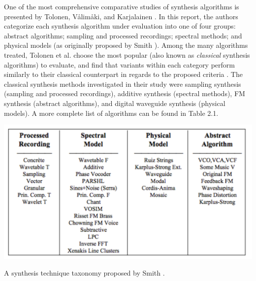 \documentclass[12pt]{report} 	%
\numberwithin{figure}{chapter}
\numberwithin{table}{chapter}
\numberwithin{equation}{chapter}
\begin{document}
\begin{flushleft}
One of the most comprehensive comparative studies of synthesis algorithms is presented by Tolonen, V\aa lim\aa ki, and Karjalainen \cite{Tolonen:1998bh}. In this report, the authors categorize each synthesis algorithm under evaluation into one of four groups: abstract algorithms; sampling and processed recordings; spectral methods; and physical models (as originally proposed by Smith \cite{III:1991hc}). Among the many algorithms treated, Tolonen et al. choose the most popular (also known as \textit{classical} synthesis algorithms) to evaluate, and find that variants within each category perform similarly to their classical counterpart in regards to the proposed criteria \cite[p. 101]{Tolonen:1998bh}. The classical synthesis methods investigated in their study were sampling synthesis (sampling and processed recordings), additive synthesis (spectral methods), FM synthesis (abstract algorithms), and digital waveguide synthesis (physical models). A more complete list of algorithms can be found in Table 2.1.
\begin{table}[h!]
\begin{center}
\includegraphics[scale=0.7]{SynthesisTechniqueTaxonomy}
\caption[Synthesis technique taxonomy]{A synthesis technique taxonomy proposed by Smith \protect\cite{III:1991hc}.}
\end{center}
\end{table}


\end{flushleft}
\end{document}

